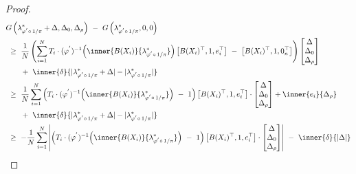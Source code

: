 \begin{proof}
\begin{align*}
  &
  G
   \left( 
\lambda^*_{\varphi^{'}\circ\,1/\pi}
+\Delta
,
\Delta_0
,
\Delta_\rho
   \right)
   \ 
   -
   \ 
   G
   \left(
\lambda^*_{\varphi^{'}\circ\,1/\pi}
,0,0
   \right)
   \\
   &
   \ 
   \ge
   \ 
   \frac{1}{N}
  \left( 
\sum_{i=1} 
  ^N
  T_i
  \cdot
  (
  \varphi^{'}
  )
  ^{-1}
  \!
  \left( 
\inner
{B(X_i)}
{
\lambda^*_{\varphi^{'}\circ\,1/\pi}
}
  \right)
  \left[ 
    B(X_i)^\top,1,e_i^\top
  \right]
  \ 
  -
  \ 
  \left[ 
    B(X_i)^\top,1,0_n^\top
  \right]
  \right)
  \begin{bmatrix}
    \Delta
    \\
    \Delta_0
    \\
    \Delta_\rho
  \end{bmatrix}
    \\
  &
  \qquad
  +
  \ 
  \inner{\delta}
  {|
\lambda^*_{\varphi^{'}\circ\,1/\pi}
+
\Delta
  |
  -
  |
\lambda^*_{\varphi^{'}\circ\,1/\pi}
  |
}
\\
   &
   \ 
   \ge
   \ 
   \frac{1}{N}
\sum_{i=1} 
  ^N
  \left( 
    T_i\cdot
  (
  \varphi^{'}
  )
  ^{-1}
  \!
  \left( 
\inner
{B(X_i)}
{
\lambda^*_{\varphi^{'}\circ\,1/\pi}
}
  \right)
  \ 
  -
  \ 
  1
  \right)
  \left[ 
    B(X_i)^\top,1,e_i^\top
  \right]
  \cdot
  \begin{bmatrix}
    \Delta
    \\
    \Delta_0
    \\
    \Delta_\rho
  \end{bmatrix}
  +
  \inner{e_i}{\Delta_\rho}
  \\
  &
  \qquad
  +
  \ 
  \inner{\delta}
  {|
\lambda^*_{\varphi^{'}\circ\,1/\pi}
+
\Delta
  |
  -
  |
\lambda^*_{\varphi^{'}\circ\,1/\pi}
  |
}
\\
   &
   \ 
   \ge
   \ 
   -
   \frac{1}{N}
\sum_{i=1} 
  ^N
  \left|
   \left( 
     T_i\cdot
  (
  \varphi^{'}
  )
  ^{-1}
  \!
  \left( 
\inner
{B(X_i)}
{
\lambda^*_{\varphi^{'}\circ\,1/\pi}
}
  \right)
  \ 
  -
  \ 
  1
  \right)
  \left[ 
    B(X_i)^\top,1,e_i^\top
  \right]
  \cdot
  \begin{bmatrix}
    \Delta
    \\
    \Delta_0
    \\
    \Delta_\rho
  \end{bmatrix}
  \right|
    \ 
  -
  \ 
  \inner{\delta}
  {|
\Delta
  |
}
\end{align*}

\end{proof}
